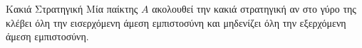 {}
\begin{definitiongr}{Κακιά Στρατηγική}
  Μία παίκτης $A$ ακολουθεί την κακιά στρατηγική αν στο γύρο της κλέβει όλη την εισερχόμενη άμεση εμπιστοσύνη και μηδενίζει
  όλη την εξερχόμενη άμεση εμπιστοσύνη.
\end{definitiongr}

